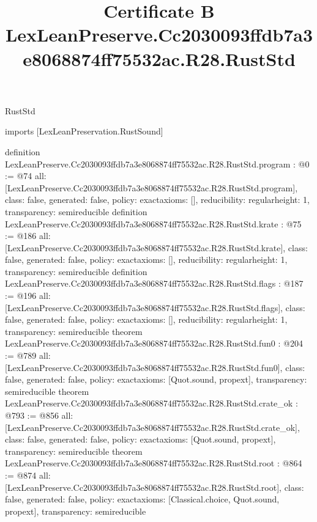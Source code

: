 \begin{lexlean}{RustStd}
\title{Certificate B LexLeanPreserve.Cc2030093ffdb7a3e8068874ff75532ac.R28.RustStd}
\begin{coremodule}
imports [LexLeanPreservation.RustSound]

definition LexLeanPreserve.Cc2030093ffdb7a3e8068874ff75532ac.R28.RustStd.program : @0 := @74 {
  all: [LexLeanPreserve.Cc2030093ffdb7a3e8068874ff75532ac.R28.RustStd.program],
  class: false,
  generated: false,
  policy: exact{axioms: []},
  reducibility: regular{height: 1},
  transparency: semireducible
}
definition LexLeanPreserve.Cc2030093ffdb7a3e8068874ff75532ac.R28.RustStd.krate : @75 := @186 {
  all: [LexLeanPreserve.Cc2030093ffdb7a3e8068874ff75532ac.R28.RustStd.krate],
  class: false,
  generated: false,
  policy: exact{axioms: []},
  reducibility: regular{height: 1},
  transparency: semireducible
}
definition LexLeanPreserve.Cc2030093ffdb7a3e8068874ff75532ac.R28.RustStd.flags : @187 := @196 {
  all: [LexLeanPreserve.Cc2030093ffdb7a3e8068874ff75532ac.R28.RustStd.flags],
  class: false,
  generated: false,
  policy: exact{axioms: []},
  reducibility: regular{height: 1},
  transparency: semireducible
}
theorem LexLeanPreserve.Cc2030093ffdb7a3e8068874ff75532ac.R28.RustStd.fun0 : @204 := @789 {
  all: [LexLeanPreserve.Cc2030093ffdb7a3e8068874ff75532ac.R28.RustStd.fun0],
  class: false,
  generated: false,
  policy: exact{axioms: [Quot.sound, propext]},
  transparency: semireducible
}
theorem LexLeanPreserve.Cc2030093ffdb7a3e8068874ff75532ac.R28.RustStd.crate_ok : @793 := @856 {
  all: [LexLeanPreserve.Cc2030093ffdb7a3e8068874ff75532ac.R28.RustStd.crate_ok],
  class: false,
  generated: false,
  policy: exact{axioms: [Quot.sound, propext]},
  transparency: semireducible
}
theorem LexLeanPreserve.Cc2030093ffdb7a3e8068874ff75532ac.R28.RustStd.root : @864 := @874 {
  all: [LexLeanPreserve.Cc2030093ffdb7a3e8068874ff75532ac.R28.RustStd.root],
  class: false,
  generated: false,
  policy: exact{axioms: [Classical.choice, Quot.sound, propext]},
  transparency: semireducible
}


\end{coremodule}
\end{lexlean}
